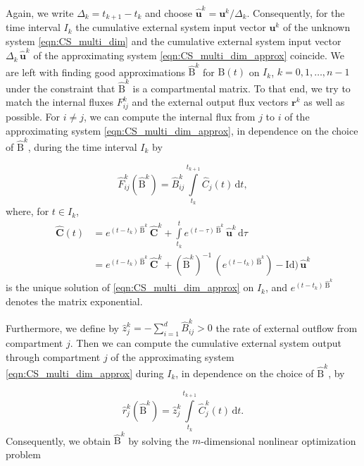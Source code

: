 \documentclass[11pt,a4paper]{article}
\renewcommand{\vec}[1]{\mathbf{#1}}
\newcommand{\tens}[1]{\mathrm{#1}}
\newcommand{\id}{\tens{Id}}
\newcommand{\dd}[1]{\,\mathrm{d}#1}
\newcommand{\intl}{\int\limits}
\begin{document}
        Again, we write $\Delta_k=t_{k+1}-t_k$ and choose $\widehat{\vec{u}}^k=\vec{u}^k/\Delta_k$.
        Consequently, for the time interval $I_k$ the cumulative external system input vector $\vec{u}^k$ of the unknown system \eqref{eqn:CS_multi_dim} and the cumulative external system input vector $\Delta_k\,\widehat{\vec{u}}^k$ of the approximating system \eqref{eqn:CS_multi_dim_approx} coincide.
        We are left with finding good approximations $\widehat{\tens{B}}^k$ for $\tens{B}(t)$ on $I_k$, $k=0,1,\ldots,n-1$ under the constraint that $\widehat{\tens{B}}^k$ is a compartmental matrix.
        To that end, we try to match the internal fluxes $F^k_{ij}$ and the external output flux vectors $\vec{r}^k$ as well as possible.
        For $i\neq j$, we can compute the internal flux from $j$ to $i$ of the approximating system \eqref{eqn:CS_multi_dim_approx}, in dependence on the choice of $\widehat{\tens{B}}^k$, during the time interval $I_k$ by
        
        \begin{equation*}
            \widehat{F}^k_{ij}(\widehat{\tens{B}}^k) = \widehat{B}^k_{ij}\intl_{t_k}^{t_{k+1}} \widehat{C}_j(t)\dd{t},
        \end{equation*}
        where, for $t\in I_k$,
        \begin{align*}
            \widehat{\vec{C}}(t) &= e^{(t-t_k)\,\widehat{\tens{B}}^k}\,\widehat{\vec{C}}^k + \intl_{t_k}^t e^{(t-\tau)\,\widehat{\tens{B}}^k}\,\widehat{\vec{u}}^k\dd{\tau}\\
            &= e^{(t-t_k)\,\widehat{\tens{B}}^k}\,\widehat{\vec{C}}^k + (\widehat{\tens{B}}^k)^{-1}\,(e^{(t-t_k)\,\widehat{\tens{B}}^k})-\id)\,\widehat{\vec{u}}^k
        \end{align*}
        is the unique solution of \eqref{eqn:CS_multi_dim_approx} on $I_k$, and $e^{(t-t_k)\,\widehat{\tens{B}}^k}$ denotes the matrix exponential.

        Furthermore, we define by $\widehat{z}^k_j=-\sum_{i=1}^d \widehat{B}^k_{ij}>0$ the rate of external outflow from compartment $j$.
        Then we can compute the cumulative external system output through compartment $j$ of the approximating system \eqref{eqn:CS_multi_dim_approx} during $I_k$, in dependence on the choice of $\widehat{\tens{B}}^k$, by
        
        \begin{equation*}
            \widehat{r}^k_j(\widehat{\tens{B}}^k) = \widehat{z}^k_j\intl_{t_k}^{t_{k+1}} \widehat{C}^k_j(t)\dd{t}.
        \end{equation*}
        Consequently, we obtain $\widehat{\tens{B}}^k$ by solving the $m$-dimensional nonlinear optimization problem
        
\end{document}
